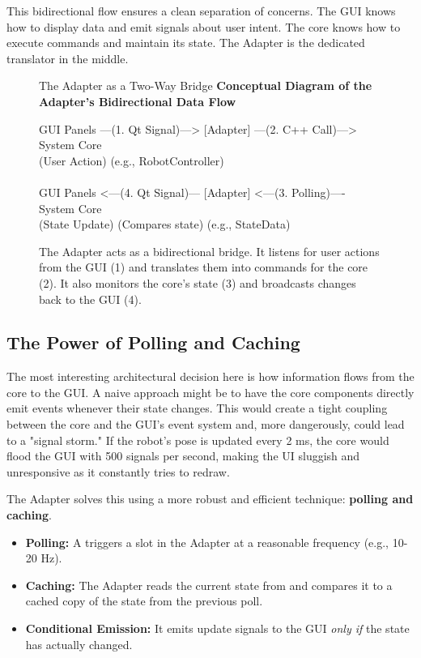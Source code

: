 This bidirectional flow ensures a clean separation of concerns. The GUI knows how to display data and emit signals about user intent. The core knows how to execute commands and maintain its state. The Adapter is the dedicated translator in the middle.

\begin{figure}[h!]
    \centering
    \begin{infobox}{The Adapter as a Two-Way Bridge}
        \textbf{Conceptual Diagram of the Adapter's Bidirectional Data Flow}
        \vspace{0.5cm}
        

        GUI Panels ---(1. Qt Signal)---> [Adapter] ---(2. C++ Call)---> System Core \\
        (User Action)                                                     (e.g., RobotController) \\
        \\
        GUI Panels <---(4. Qt Signal)--- [Adapter] <---(3. Polling)---- System Core \\
        (State Update)                  (Compares state)             (e.g., StateData)

    \end{infobox}
    \caption{The Adapter acts as a bidirectional bridge. It listens for user actions from the GUI (1) and translates them into commands for the core (2). It also monitors the core's state (3) and broadcasts changes back to the GUI (4).}
    \label{fig:adapter_role_conceptual}
\end{figure}

\subsection{The Power of Polling and Caching}
\label{subsec:polling_caching_insight}

The most interesting architectural decision here is how information flows from the core to the GUI. A naive approach might be to have the core components directly emit events whenever their state changes. This would create a tight coupling between the core and the GUI's event system and, more dangerously, could lead to a "signal storm." If the robot's pose is updated every 2 ms, the core would flood the GUI with 500 signals per second, making the UI sluggish and unresponsive as it constantly tries to redraw.

The Adapter solves this using a more robust and efficient technique: \textbf{polling and caching}.
\begin{itemize}
    \item \textbf{Polling:} A  triggers a slot in the Adapter at a reasonable frequency (e.g., 10-20 Hz).
    \item \textbf{Caching:} The Adapter reads the current state from  and compares it to a cached copy of the state from the previous poll.
    \item \textbf{Conditional Emission:} It emits update signals to the GUI \textit{only if} the state has actually changed.
\end{itemize}

